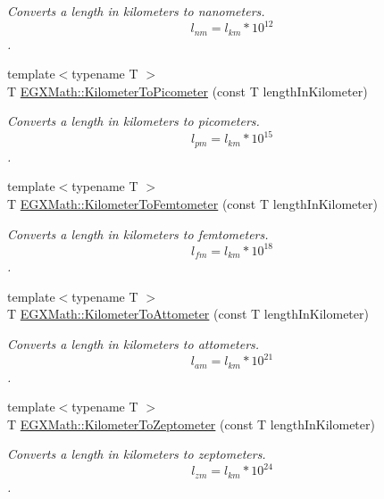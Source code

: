 \begin{DoxyCompactItemize}
\begin{DoxyCompactList}\small\item\em Converts a length in kilometers to nanometers. \[ l_{nm}=l_{km} * 10^{12} \]. \end{DoxyCompactList}\item 
{\footnotesize template$<$typename T $>$ }\\T \mbox{\hyperlink{group___e_g_x_math-_conversions-_length_conversions-_s_i-_kilometer-_s_i_ga73f6e033de3c41892f06cde1862f68d6}{E\+G\+X\+Math\+::\+Kilometer\+To\+Picometer}} (const T length\+In\+Kilometer)
\begin{DoxyCompactList}\small\item\em Converts a length in kilometers to picometers. \[ l_{pm}=l_{km} * 10^{15} \]. \end{DoxyCompactList}\item 
{\footnotesize template$<$typename T $>$ }\\T \mbox{\hyperlink{group___e_g_x_math-_conversions-_length_conversions-_s_i-_kilometer-_s_i_ga74e9c4726fddf2091c1d687e7c5f4b37}{E\+G\+X\+Math\+::\+Kilometer\+To\+Femtometer}} (const T length\+In\+Kilometer)
\begin{DoxyCompactList}\small\item\em Converts a length in kilometers to femtometers. \[ l_{fm}=l_{km} * 10^{18} \]. \end{DoxyCompactList}\item 
{\footnotesize template$<$typename T $>$ }\\T \mbox{\hyperlink{group___e_g_x_math-_conversions-_length_conversions-_s_i-_kilometer-_s_i_ga73569efb1cfc6e4972fe1cde86f221bd}{E\+G\+X\+Math\+::\+Kilometer\+To\+Attometer}} (const T length\+In\+Kilometer)
\begin{DoxyCompactList}\small\item\em Converts a length in kilometers to attometers. \[ l_{am}=l_{km} * 10^{21} \]. \end{DoxyCompactList}\item 
{\footnotesize template$<$typename T $>$ }\\T \mbox{\hyperlink{group___e_g_x_math-_conversions-_length_conversions-_s_i-_kilometer-_s_i_ga377d2c4ad2db833c5a7c16861600da49}{E\+G\+X\+Math\+::\+Kilometer\+To\+Zeptometer}} (const T length\+In\+Kilometer)
\begin{DoxyCompactList}\small\item\em Converts a length in kilometers to zeptometers. \[ l_{zm}=l_{km} * 10^{24} \]. \end{DoxyCompactList}\item 

\end{DoxyCompactItemize}
